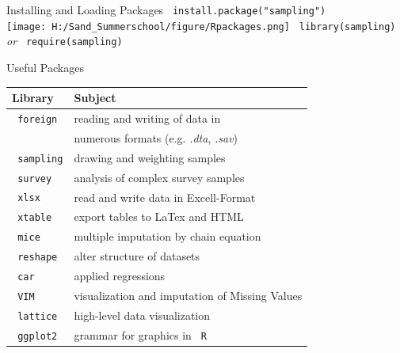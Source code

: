 \documentclass[11pt,german,hideothersubsections]{beamer}
\newcommand{\R}[1]{{\tt \color{blue}  #1}}
\begin{document}
\begin{frame}[fragile]{Installing and Loading Packages}
\R{install.package("sampling")}\\
\texttt{[image: H:/Sand\_Summerschool/figure/Rpackages.png]}
\vspace{.25cm}
\R{library(sampling)} \emph{or} \R{require(sampling)}
\end{frame}
\begin{frame}[fragile]{Useful Packages}
\renewcommand{\arraystretch}{1}
\begin{tabular}{l|l}
Library & Subject\\
\hline
\R{foreign} & reading and writing of data in\\ 
& numerous formats (e.g. \emph{.dta}, \emph{.sav})\\
\R{sampling} & drawing and weighting samples\\
\R{survey} & analysis of complex survey samples\\
\R{xlsx} & read and write data in Excell-Format\\
\R{xtable} & export tables to LaTex and HTML\\
\R{mice} & multiple imputation by chain equation\\
\R{reshape} & alter structure of datasets\\
\R{car} & applied regressions\\
\R{VIM} & visualization and imputation of Missing Values\\
\R{lattice} & high-level data visualization\\
\R{ggplot2} & grammar for graphics in \R{R}\\
\end{tabular}
\end{frame}
\end{document}
